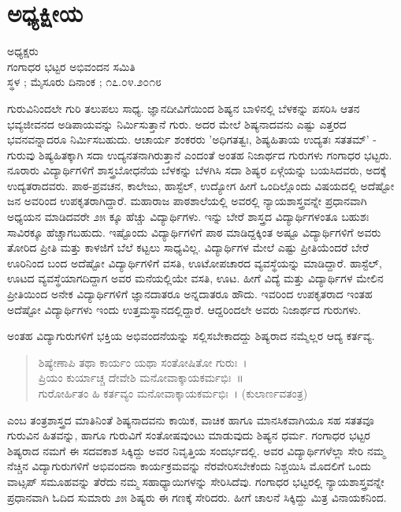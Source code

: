 \chapter{ಅಧ್ಯಕ್ಷೀಯ}

\begin{center}
\smallskip
ಅಧ್ಯಕ್ಷರು\\
ಗಂಗಾಧರ ಭಟ್ಟರ ಅಭಿವಂದನ ಸಮಿತಿ\\
ಸ್ಥಳ ; ಮೈಸೂರು ದಿನಾಂಕ ; ೧೭.೦೪.೨೦೧೮
\addrule
\end{center}
ಗುರುವಿನಿಂದಲೇ ಗುರಿ ತಲುಪಲು ಸಾಧ್ಯ. ಜ್ಞಾನದೀವಿಗೆಯಿಂದ ಶಿಷ್ಯನ ಬಾಳಿನಲ್ಲಿ ಬೆಳಕನ್ನು ಪಸರಿಸಿ ಆತನ ಭವ್ಯಜೀವನದ ಅಡಿಪಾಯವನ್ನು ನಿರ್ಮಿಸುತ್ತಾನೆ ಗುರು. ಅದರ ಮೇಲೆ ಶಿಷ್ಯನಾದವನು ಎಷ್ಟು ಎತ್ತರದ ಭವನವನ್ನಾದರೂ ನಿರ್ಮಿಸಬಹುದು. ಆಚಾರ್ಯ ಶಂಕರರು ’ಅಧಿಗತತ್ವಃ, ಶಿಷ್ಯಹಿತಾಯ ಉದ್ಯತಃ ಸತತಮ್’ - ಗುರುವು ಶಿಷ್ಯಹಿತಕ್ಕಾಗಿ ಸದಾ ಉದ್ಯನತನಾಗಿರುತ್ತಾನೆ ಎಂದಂತೆ ಅಂತಹ ನಿಜಾರ್ಥದ ಗುರುಗಳು ಗಂಗಾಧರ ಭಟ್ಟರು. ನೂರಾರು ವಿದ್ಯಾರ್ಥಿಗಳಿಗೆ ಶಾಸ್ತ್ರಬೋಧನೆಯ ಬೆಳಕನ್ನು ಬೆಳಗಿಸಿ ಸದಾ ಶಿಷ್ಯರ ಏಳ್ಗೆಯನ್ನು ಬಯಸಿದವರು, ಅದಕ್ಕೆ ಉದ್ಯತರಾದವರು. ಪಾಠ-ಪ್ರವಚನ, ಕಾಲೇಜು, ಹಾಸ್ಟೆಲ್, ಉದ್ಯೋಗ ಹೀಗೆ ಒಂದಿಲ್ಲೊಂದು ವಿಷಯದಲ್ಲಿ ಅದೆಷ್ಟೋ ಜನ ಅವರಿಂದ ಉಪಕೃತರಾಗಿದ್ದಾರೆ. ಮಹಾರಾಜ ಪಾಠಶಾಲೆಯಲ್ಲಿ ಅವರಲ್ಲಿ ನ್ಯಾಯಶಾಸ್ತ್ರವನ್ನೇ ಪ್ರಧಾನವಾಗಿ ಅಧ್ಯಯನ ಮಾಡಿದವರೇ ೨೫ ಕ್ಕೂ ಹೆಚ್ಚು ವಿದ್ಯಾರ್ಥಿಗಳು. ಇನ್ನು ಬೇರೆ ಶಾಸ್ತ್ರದ ವಿದ್ಯಾರ್ಥಿಗಳಂತೂ ಬಹುಶಃ ಸಾವಿರಕ್ಕೂ ಹೆಚ್ಚಾಗಬಹುದು. ಇಷ್ಟೊಂದು ವಿದ್ಯಾರ್ಥಿಗಳಿಗೆ ಪಾಠ ಮಾಡಿದ್ದಕ್ಕಿಂತ ಅಷ್ಟೂ ವಿದ್ಯಾರ್ಥಿಗಳಿಗೆ ಅವರು ತೋರಿದ ಪ್ರೀತಿ ಮತ್ತು ಕಾಳಜಿಗೆ ಬೆಲೆ ಕಟ್ಟಲು ಸಾಧ್ಯವಿಲ್ಲ. ವಿದ್ಯಾರ್ಥಿಗಳ ಮೇಲೆ ಎಷ್ಟು ಪ್ರೀತಿಯೆಂದರೆ ಬೇರೆ ಊರಿನಿಂದ ಬಂದ ಅದೆಷ್ಟೋ ವಿದ್ಯಾರ್ಥಿಗಳಿಗೆ ವಸತಿ, ಊಟೋಪಚಾರದ ವ್ಯವಸ್ಥೆಯನ್ನು ಮಾಡಿದ್ದಾರೆ. ಹಾಸ್ಟೆಲ್, ಊಟದ ವ್ಯವಸ್ಥೆಯಾಗದಿದ್ದಾಗ ಅವರ ಮನೆಯಲ್ಲಿಯೇ ವಸತಿ, ಊಟ. ಹೀಗೆ ವಿದ್ಯೆ ಮತ್ತು ವಿದ್ಯಾರ್ಥಿಗಳ ಮೇಲಿನ ಪ್ರೀತಿಯಿಂದ ಅನೇಕ ವಿದ್ಯಾರ್ಥಿಗಳಿಗೆ ಜ್ಞಾನದಾತರೂ ಅನ್ನದಾತರೂ ಹೌದು. ಇವರಿಂದ ಉಪಕೃತರಾದ ಇಂತಹ ಅದೆಷ್ಟೋ ವಿದ್ಯಾರ್ಥಿಗಳು ಇಂದು ಉತ್ತಮಸ್ಥಾನದಲ್ಲಿದ್ದಾರೆ. ಆದ್ದರಿಂದಲೇ ಅವರು ನಿಜಾರ್ಥದ ಗುರುಗಳು.

ಅಂತಹ ವಿದ್ಯಾಗುರುಗಳಿಗೆ ಭಕ್ತಿಯ ಅಭಿವಂದನೆಯನ್ನು ಸಲ್ಲಿಸಬೇಕಾದದ್ದು ಶಿಷ್ಯರಾದ ನಮ್ಮೆಲ್ಲರ ಆದ್ಯ ಕರ್ತವ್ಯ.
\begin{verse}
ಶಿಷ್ಯೇಣಾಪಿ ತಥಾ ಕಾರ್ಯಂ ಯಥಾ ಸಂತೋಷಿತೋ ಗುರುಃ~।\\
ಪ್ರಿಯಂ ಕುರ್ಯಾಚ್ಚ ದೇವೇಶಿ ಮನೋವಾಕ್ಕಾಯಕರ್ಮಭಿಃ~॥\\
ಗುರೋರ್ಹಿತಂ ಹಿ ಕರ್ತವ್ಯಂ ಮನೋವಾಕ್ಕಾಯಕರ್ಮಭಿಃ~। (ಕುಲಾರ್ಣವತಂತ್ರ)
\end{verse}
ಎಂಬ ತಂತ್ರಶಾಸ್ತ್ರದ ಮಾತಿನಿಂತೆ ಶಿಷ್ಯನಾದವನು ಕಾಯಿಕ, ವಾಚಿಕ ಹಾಗೂ ಮಾನಸಿಕವಾಗಿಯೂ ಸಹ ಸತತವೂ ಗುರುವಿನ ಹಿತವನ್ನು, ಹಾಗೂ ಗುರುವಿಗೆ ಸಂತೋಷವುಂಟು ಮಾಡುವುದು ಶಿಷ್ಯನ ಧರ್ಮ. ಗಂಗಾಧರ ಭಟ್ಟರ ಶಿಷ್ಯರಾದ ನಮಗೆ ಈ ಸದವಕಾಶ ಸಿಕ್ಕಿದ್ದು ಅವರ ನಿವೃತ್ತಿಯ ಸಂದರ್ಭದಲ್ಲಿ. ಅವರ ವಿದ್ಯಾರ್ಥಿಗಳೆಲ್ಲಾ ಸೇರಿ ನಮ್ಮ ನೆಚ್ಚಿನ ವಿದ್ಯಾಗುರುಗಳಿಗೆ ಅಭಿವಂದನಾ ಕಾರ್ಯಕ್ರಮವನ್ನು ನೆರವೇರಿಸಬೇಕೆಂದು ನಿಶ್ಚಯಿಸಿ ಮೊದಲಿಗೆ ಒಂದು ವಾಟ್ಸಪ್ ಸಮೂಹವನ್ನು ತೆರೆದು ನಮ್ಮ ಸಹಾಧ್ಯಾಯಿಗಳನ್ನು ಸೇರಿಸಿದೆವು. ಗಂಗಾಧರ ಭಟ್ಟರಲ್ಲಿ ನ್ಯಾಯಶಾಸ್ತ್ರವನ್ನೇ ಪ್ರಧಾನವಾಗಿ ಓದಿದ ಸುಮಾರು ೨೫ ಶಿಷ್ಯರು ಈ ಗಣಕ್ಕೆ ಸೇರಿದರು. ಹೀಗೆ ಚಾಲನೆ ಸಿಕ್ಕಿದ್ದು ಮಿತ್ರ ವಿನಾಯಕನಿಂದ.

